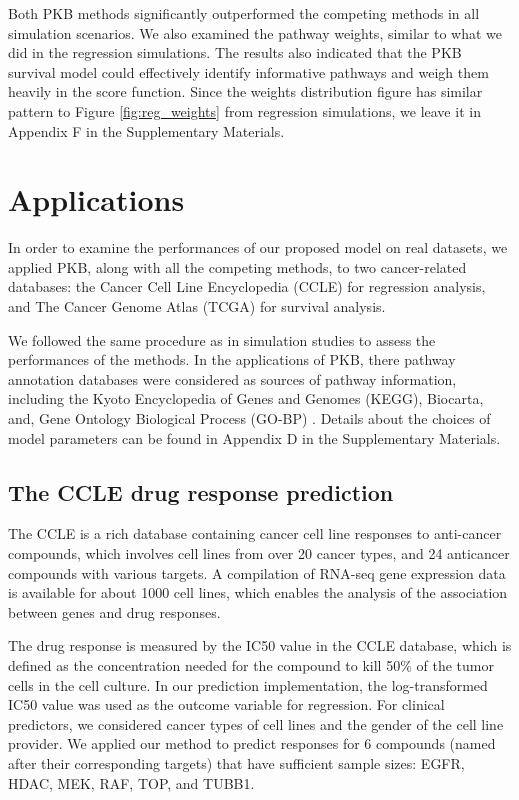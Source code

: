 \documentclass[a4paper,12pt]{article}
\begin{document}
Both PKB methods significantly outperformed the competing methods in all  simulation scenarios. We also examined the pathway weights, similar to what we did in the regression simulations. The results also indicated that the PKB survival model could effectively identify informative pathways and weigh them heavily in the score function. Since the weights distribution figure has similar pattern to Figure \ref{fig:reg_weights} from regression simulations, we leave it in Appendix F in the Supplementary Materials.

\section{Applications}\label{results}
In order to examine the performances of our proposed model on real datasets, we applied PKB, along with all the competing methods, to two cancer-related databases: the Cancer Cell Line Encyclopedia (CCLE) \citep{barretina2012cancer} for regression analysis, and The Cancer Genome Atlas (TCGA) for survival analysis. 

We followed the same procedure as in simulation studies to assess the performances of the methods. In the applications of PKB, there pathway annotation databases were considered as sources of pathway information, including the Kyoto Encyclopedia of Genes and Genomes (KEGG), \citep{kanehisa2000kegg} Biocarta, \citep{nishimura2001biocarta} and, Gene Ontology Biological Process (GO-BP) \citep{ashburner2000gene, gene2016expansion} . Details about the choices of model parameters can be found in Appendix D in the Supplementary Materials.

\subsection{The CCLE drug response prediction}

The CCLE is a rich database containing cancer cell line responses to anti-cancer compounds, which involves cell lines from over 20 cancer types, and 24 anticancer compounds with various targets. A compilation of RNA-seq gene expression data is available for about 1000 cell lines, which enables the analysis of the association between genes and drug responses. 

The drug response is measured by the IC50 value in the CCLE database, which is defined as the concentration needed for the compound to kill 50$\%$ of the tumor cells in the cell culture. In our prediction implementation, the log-transformed IC50 value was used as the outcome variable for regression. For clinical predictors, we considered cancer types of cell lines and the gender of the cell line provider. We applied our method to predict responses for 6 compounds (named after their corresponding targets) that have sufficient sample sizes: EGFR, HDAC, MEK, RAF, TOP, and TUBB1. 
\end{document}
